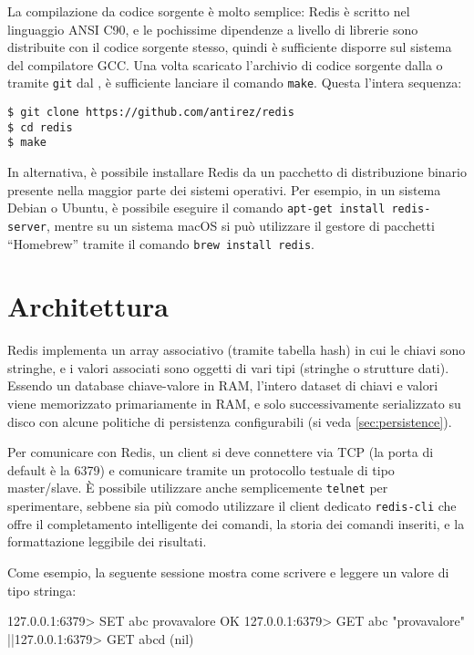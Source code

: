 La compilazione da codice sorgente è molto semplice: Redis è scritto nel linguaggio ANSI C90, e le
pochissime dipendenze a livello di librerie sono distribuite con il codice sorgente stesso, quindi è
sufficiente disporre sul sistema del compilatore GCC. Una volta scaricato l'archivio di codice
sorgente dalla  o tramite
\verb|git| dal , è
sufficiente lanciare il comando \verb|make|. Questa l'intera sequenza:

\medskip
\begin{lstlisting}
$ git clone https://github.com/antirez/redis
$ cd redis
$ make
\end{lstlisting}

In alternativa, è possibile installare Redis da un pacchetto di distribuzione binario
presente nella maggior parte dei sistemi operativi. Per esempio, in un sistema Debian
o Ubuntu, è possibile eseguire il comando \verb|apt-get install redis-server|, mentre
su un sistema macOS si può utilizzare il gestore di pacchetti ``Homebrew'' tramite il
comando \verb|brew install redis|.

\section{Architettura}
\label{sec:redis:arch}

Redis implementa un array associativo (tramite tabella hash) in cui le chiavi sono stringhe, e i
valori associati sono oggetti di vari tipi (stringhe o strutture dati). Essendo un database
chiave-valore in RAM, l'intero dataset di chiavi e valori viene memorizzato primariamente in RAM, e
solo successivamente serializzato su disco con alcune politiche di persistenza configurabili (si
veda \autoref{sec:persistence}).

Per comunicare con Redis, un client si deve connettere via TCP (la porta di default è la 6379) e
comunicare tramite un protocollo testuale di tipo master/slave. È possibile utilizzare
anche semplicemente \verb|telnet| per sperimentare, sebbene sia più comodo utilizzare il
client dedicato \verb|redis-cli| che offre il completamento intelligente dei comandi, la
storia dei comandi inseriti, e la formattazione leggibile dei risultati.

Come esempio, la seguente sessione mostra come scrivere e leggere un valore di tipo
stringa:

\begin{commentedsource}[style=redis]
127.0.0.1:6379> SET abc provavalore
OK
127.0.0.1:6379> GET abc
"provavalore"
|\lnote|127.0.0.1:6379> GET abcd
(nil)
\end{commentedsource}

